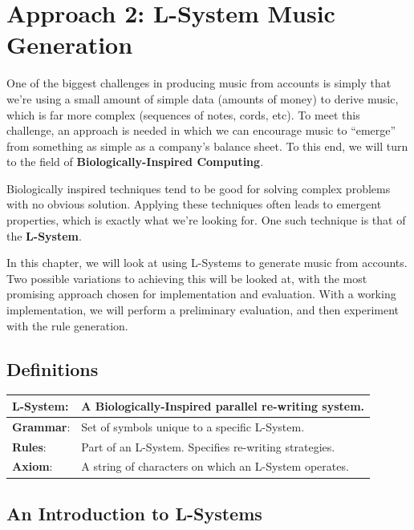 \chapter{Approach 2: L-System Music Generation}

One of the biggest challenges in producing music from accounts is simply that we're using a small amount of simple data (amounts of money) to derive music, which is far more complex (sequences of notes, cords, etc). To meet this challenge, an approach is needed in which we can encourage music to ``emerge'' from something as simple as a company's balance sheet. To this end, we will turn to the field of \textbf{Biologically-Inspired Computing}.

Biologically inspired techniques tend to be good for solving complex problems with no obvious solution. Applying these techniques often leads to emergent properties, which is exactly what we're looking for. One such technique is that of the \textbf{L-System}.

In this chapter, we will look at using L-Systems to generate music from accounts. Two possible variations to achieving this will be looked at, with the most promising approach chosen for implementation and evaluation. With a working implementation, we will perform a preliminary evaluation, and then experiment with the rule generation.

\section{Definitions}

\begin{center}
\begin{singlespace}
\begin{tabular}{ l l }
\hline
\hline
\textbf{L-System}: & A Biologically-Inspired parallel re-writing system. \\ \hline
\textbf{Grammar}: & Set of symbols unique to a specific L-System. \\ \hline
\textbf{Rules}: & Part of an L-System. Specifies re-writing strategies. \\ \hline
\textbf{Axiom}: & A string of characters on which an L-System operates. \\ \hline
\hline
\end{tabular}
\end{singlespace}
\end{center}

\section{An Introduction to L-Systems}

